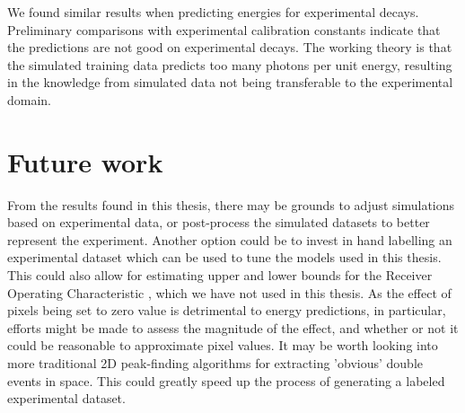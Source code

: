 We found similar results when predicting energies for experimental decays. Preliminary comparisons
with experimental calibration constants indicate that the predictions are not good on experimental
decays. The working theory is that the simulated training data predicts too many photons per unit
energy, resulting in the knowledge from simulated data not being transferable to the experimental
domain.

\section{Future work}
From the results found in this thesis, there may be grounds to adjust simulations based on
experimental data, or post-process the simulated datasets to better represent the experiment.
Another option could be to invest in hand labelling an experimental dataset which can be used
to tune the models used in this thesis. This could also allow for estimating upper and lower bounds
for the Receiver Operating Characteristic \cite{Claesen2015}, which we have not used in this thesis.
As the effect of pixels being set to zero value is detrimental to energy predictions, in particular,
efforts might be made to assess the magnitude of the effect, and whether or not it could be reasonable
to approximate pixel values. It may be worth looking into more traditional 2D peak-finding algorithms
for extracting 'obvious' double events in space. This could greatly speed up the process of generating a
labeled experimental dataset.